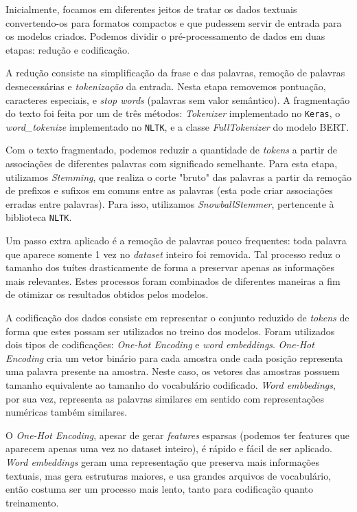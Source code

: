 \documentclass[twoside,conference,a4paper]{IEEEtran}
\begin{document}
    Inicialmente, focamos em diferentes jeitos de tratar os dados textuais convertendo-os para formatos compactos e que pudessem servir de entrada para os modelos criados. Podemos dividir o pré-processamento de dados em duas etapas: redução e codificação. 
    
	A redução consiste na simplificação da frase e das palavras, remoção de palavras desnecessárias e \textit{tokenização} da entrada. Nesta etapa removemos pontuação, caracteres especiais, e \textit{stop words} (palavras sem valor semântico). A fragmentação do texto foi feita por um de três métodos: \textit{Tokenizer} implementado no \texttt{Keras}, o \textit{word\_tokenize} implementado no \texttt{NLTK}, e a classe \textit{FullTokenizer} do modelo BERT.
	
	Com o texto fragmentado, podemos reduzir a quantidade de \textit{tokens} a partir de associações de diferentes palavras com significado semelhante. Para esta etapa, utilizamos \textit{Stemming}, que realiza o corte "bruto" das palavras a partir da remoção de prefixos e sufixos em comuns entre as palavras (esta pode criar associações erradas entre palavras). Para isso, utilizamos \textit{SnowballStemmer}, pertencente à biblioteca \texttt{NLTK}.
	
	Um passo extra aplicado é a remoção de palavras pouco frequentes: toda palavra que aparece somente 1 vez no \textit{dataset} inteiro foi removida. Tal processo reduz o tamanho dos tuítes drasticamente de forma a preservar apenas as informações mais relevantes. Estes processos foram combinados de diferentes maneiras a fim de otimizar os resultados obtidos pelos modelos.
	
	A codificação dos dados consiste em representar o conjunto reduzido de \textit{tokens} de forma que estes possam ser utilizados no treino dos modelos. Foram utilizados dois tipos de codificações: \textit{One-hot Encoding} e \textit{word embeddings}. \textit{One-Hot Encoding} cria um vetor binário para cada amostra onde cada posição representa uma palavra presente na amostra. Neste caso, os vetores das amostras possuem tamanho equivalente ao tamanho do vocabulário codificado. \textit{Word embbedings}, por sua vez, representa as palavras similares em sentido com representações numéricas também similares.
	
	O \textit{One-Hot Encoding}, apesar de gerar \textit{features} esparsas (podemos ter features que aparecem apenas uma vez no dataset inteiro), é rápido e fácil de ser aplicado. \textit{Word embeddings} geram uma representação que preserva mais informações textuais, mas gera estruturas maiores, e usa grandes arquivos de vocabulário, então costuma ser um processo mais lento, tanto para codificação quanto treinamento.
\end{document}
